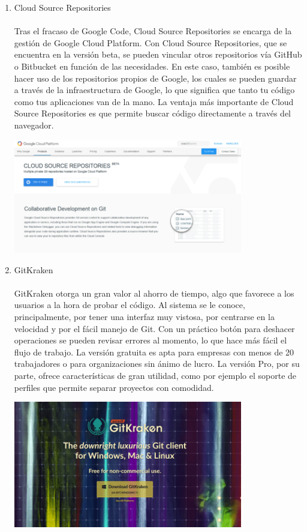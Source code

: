 \begin{enumerate}[1.]
	\item Cloud Source Repositories
	\\
	\\Tras el fracaso de Google Code, Cloud Source Repositories se encarga de la gestión de Google Cloud Platform. Con Cloud Source Repositories, que se encuentra en la versión beta, se pueden vincular otros repositorios vía GitHub o Bitbucket en función de las necesidades. En este caso, también es posible hacer uso de los repositorios propios de Google, los cuales se pueden guardar a través de la infraestructura de Google, lo que significa que tanto tu código como tus aplicaciones van de la mano.  La ventaja más importante de Cloud Source Repositories es que permite buscar código directamente a través del navegador.

	\begin{center}
	\includegraphics[width=10cm]{./Imagenes/git5} 
	\end{center}


	\item GitKraken
	\\
	\\GitKraken otorga un gran valor al ahorro de tiempo, algo que favorece a los usuarios a la hora de probar el código. Al sistema se le conoce, principalmente, por tener una interfaz muy vistosa, por centrarse en la velocidad y por el fácil manejo de Git. Con un práctico botón para deshacer operaciones se pueden revisar errores al momento, lo que hace más fácil el flujo de trabajo. La versión gratuita es apta para empresas con menos de 20 trabajadores o para organizaciones sin ánimo de lucro. La versión Pro, por su parte, ofrece características de gran utilidad, como por ejemplo el soporte de perfiles que permite separar proyectos con comodidad.



	\begin{center}
	\includegraphics[width=10cm]{./Imagenes/git6} 
	\end{center}


\end{enumerate}

